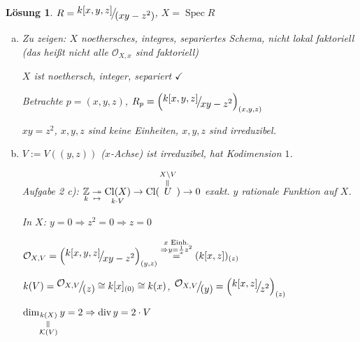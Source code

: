 \documentclass[paper = A4, fontsize=12pt, numbers=noendperiod, chapterprefix=true]{scrbook}
\theoremstyle{break}
\newtheorem{Loes}{L\"osung}
\theoremstyle{nonumberbreak}
\theoremstyle{nonumberplain}
\newcommand{\quot}[1]{\textrm{\glqq}{#1}\textrm{\grqq}}
\newcommand{\verteq}{\rotatebox{90}{$=$}}
\DeclareMathOperator{\Cl}{Cl}
\DeclareMathOperator{\Spec}{Spec}
\DeclareMathOperator{\ddiv}{div}
\newcommand{\Z}{\mathbb{Z}}
\newcommand{\calK}{\mathcal{K}}
\newcommand{\calO}{\mathcal{O}}
\newcommand{\FakRaum}[2]{
	\raisebox{0.7ex}{\ensuremath{#1}}
	\ensuremath{\mkern-3mu}\big/\ensuremath{\mkern-3mu}
	\raisebox{-0.6ex}{\ensuremath{#2}}}
\begin{document}
\begin{Loes}
$R = \FakRaum{k[x,y,z]}{(xy-z^2)}$, $X = \Spec R$
\begin{center}\end{center}
\begin{enumerate}[a)]
\item
	\emph{Zu zeigen:} $X$ noethersches, integres, separiertes Schema, nicht lokal faktoriell (das hei\ss t nicht alle $\calO_{X,x}$ sind faktoriell)
	
	$X$ ist noethersch, integer, separiert $\checkmark$
	
	Betrachte $p = (x,y,z)$, $R_p = \left( \FakRaum{k[x,y,z]}{xy-z^2} \right)_{(x,y,z)}$
	
	$xy = z^2$, $x,y,z$ sind keine Einheiten, $x,y,z$ sind irreduzibel.
\item
	$V := V((y,z))$ (\quot{$x$-Achse}) ist irreduzibel, hat Kodimension $1$.
	
	Aufgabe 2 c): $\underset{k}{\Z} \underset{\mapsto}{\twoheadrightarrow} \underset{k \cdot V}{\Cl(X)} \to \Cl(\overset{\substack{ X \setminus V\\ \verteq}}{U}) \to 0$ exakt. $y$ rationale Funktion auf $X$.
	
	In $X$: $y = 0 \Rightarrow z^2 = 0 \Rightarrow z = 0$
	
	$\calO_{X,V} = \left( \FakRaum{k[x,y,z]}{xy -z^2} \right)_{(y,z)} \overset{\substack{x \text{ Einh.} \\ \Rightarrow y = \frac{1}{x} z^2}}{=} (k[x,z])_{(z)}$
	
	$k(V) = \FakRaum{\calO_{X,V}}{(z)} \cong k[x]_{(0)} \cong k(x)$, $\FakRaum{\calO_{X,V}}{(y)} = \left( \FakRaum{k[x,z]}{z^2} \right)_{(z)}$
	
	$\dim_{\underset{\substack{\verteq \\ \calK(V)}}{k(X)}} y = 2 \Rightarrow \ddiv y = 2 \cdot V$
	

\end{enumerate}
\end{Loes}
\end{document}
